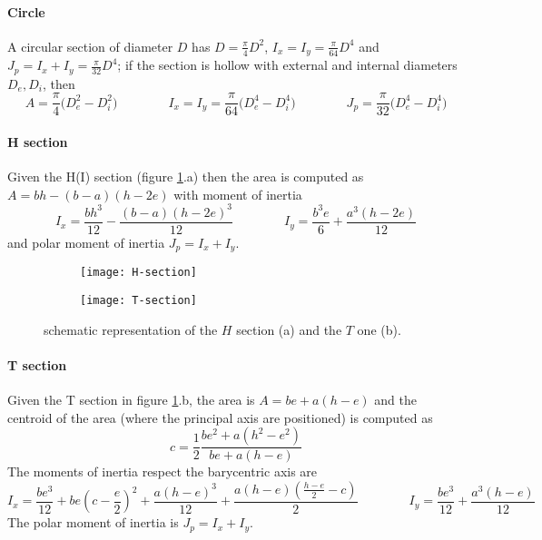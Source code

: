 	\paragraph{Circle} A circular section of diameter $D$ has $D = \frac \pi 4 D^2$, $I_x = I_y = \frac \pi {64}D^4$ and $J_p = I_x + I_y = \frac \pi {32} D^4$; if the section is hollow with external and internal diameters $D_e,D_i$, then
	\[ A = \frac\pi 4 \big(D_e^2-D_i^2\big) \qquad \qquad I_x = I_y = \frac \pi {64}\big(D_e^4-D_i^4\big) \qquad \qquad J_p = \frac \pi {32} \big(D_e^4-D_i^4\big) \]
	

	\paragraph{H section} Given the H(I) section (figure \ref{fig:THsections}.a) then the area is computed as $A = bh - (b-a)(h-2e)$ with moment of inertia 
	\[ I_x = \frac{bh^3}{12}- \frac{(b-a)(h-2e)^3}{12} \qquad \qquad I_y = \frac{b^3e}{6} + \frac{a^3(h-2e)}{12} \]
	and polar moment of inertia $J_p = I_x + I_y$.
	
	\begin{figure}[bht]
		\centering
		\begin{subfigure}{0.48\linewidth}
			\centering \texttt{[image: H-section]} \caption{}
		\end{subfigure}
		\begin{subfigure}{0.48\linewidth}
			\centering \texttt{[image: T-section]} \caption{}
		\end{subfigure}
		\caption{schematic representation of the $H$ section (a) and the $T$ one (b).} \label{fig:THsections}
	\end{figure}
	
	\paragraph{T section} Given the T section in figure \ref{fig:THsections}.b, the area is $A = be + a(h-e)$ and the centroid of the area (where the principal axis are positioned) is computed as
	\[ c = \frac 1 2 \frac{be^2 + a(h^2-e^2)}{be + a (h-e)} \]
	The moments of inertia respect the barycentric axis are
	\[ I_x = \frac{be^3}{12} + be\left( c-\frac e2\right)^2 + \frac{a(h-e)^3}{12} + \frac{a(h-e)\left( \frac{h-e}{2} - c \right)}{2} \qquad \qquad I_y = \frac{be^3}{12} + \frac{a^3(h-e)}{12} \]
	The polar moment of inertia is $J_p = I_x + I_y$.
	
	
	
	
	
	
	
	
	
	
	
	
	
	
	
	
	
	
	
	
	
	
	
		
